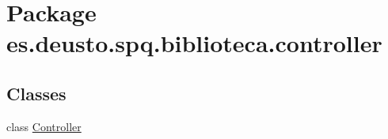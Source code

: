 \hypertarget{namespacees_1_1deusto_1_1spq_1_1biblioteca_1_1controller}{}\section{Package es.\+deusto.\+spq.\+biblioteca.\+controller}
\label{namespacees_1_1deusto_1_1spq_1_1biblioteca_1_1controller}
\subsection*{Classes}
\begin{DoxyCompactItemize}
\item 
class \mbox{\hyperlink{classes_1_1deusto_1_1spq_1_1biblioteca_1_1controller_1_1_controller}{Controller}}
\end{DoxyCompactItemize}
